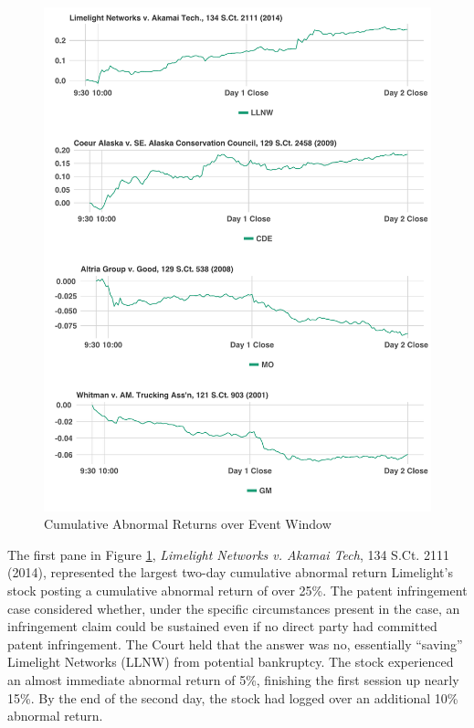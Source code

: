 \documentclass[preprint,12pt]{elsarticle}
\begin{document}
\begin{figure}[h!]
\centering
\includegraphics[scale=0.5]{figure5_case_studies.pdf}
\caption{Cumulative Abnormal Returns over Event Window}
\label{abnormal_return_event_case_study}
\end{figure}

The first pane in Figure \ref{abnormal_return_event_case_study}, \textit{Limelight Networks v. Akamai Tech}, 134 S.Ct. 2111 (2014), represented the largest two-day cumulative abnormal return Limelight's stock posting a cumulative abnormal return of over 25\%.  The patent infringement case considered whether, under the specific circumstances present in the case, an infringement claim could be sustained even if no direct party had committed patent infringement.  The Court held that the answer was no, essentially ``saving'' Limelight Networks (LLNW) from potential bankruptcy. The stock experienced  an almost immediate abnormal return of 5\%, finishing the first session up nearly 15\%.  By the end of the second day, the stock had logged over an additional 10\% abnormal return.
\end{document}

